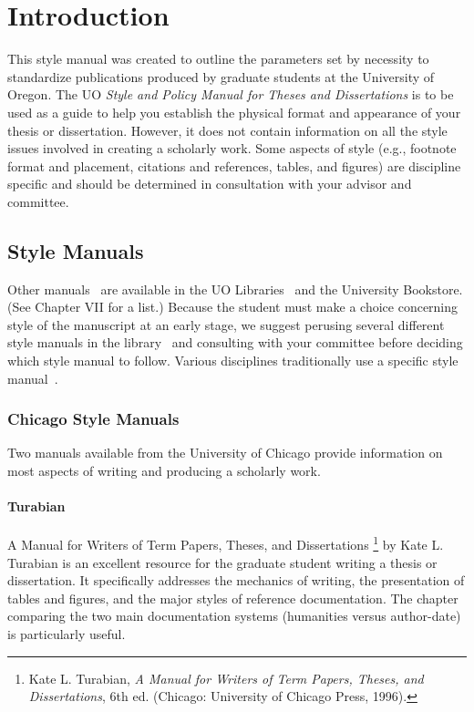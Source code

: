 \chapter{Introduction}


This style manual was created to outline the parameters set by necessity to standardize publications produced by graduate students at the University of Oregon. The UO \emph{Style and Policy Manual for Theses and Dissertations} is to be used as a guide to help you establish the physical format and appearance of your thesis or dissertation. However, it does not contain information on all the style issues involved in creating a scholarly work. Some aspects of style (e.g., footnote format and placement, citations and references, tables, and figures) are discipline specific and should be determined in consultation with your advisor and committee.

\section{Style Manuals}

Other manuals~\cite{Codishetal2000} are available in the UO Libraries~\cite{Meyer2000} and the University Bookstore. (See Chapter VII for a list.) Because the student must make a choice concerning style of the manuscript at an early stage, we suggest perusing several different style manuals in the library~\cite{Huetal2000} and consulting with your committee before deciding which style manual to follow. Various disciplines traditionally use a specific style manual~\cite{Conway2000}.

\subsection{Chicago Style Manuals}

Two manuals available from the University of Chicago provide information on most aspects of writing and producing a scholarly work.

\subsubsection{Turabian}

A Manual for Writers of Term Papers, Theses, and Dissertations \footnote{Kate L. Turabian, \emph{A Manual for Writers of Term Papers, Theses, and Dissertations}, 6th ed. (Chicago: University of Chicago Press, 1996).} by Kate L. Turabian is an excellent resource for the graduate student writing a thesis or dissertation. It specifically addresses the mechanics of writing, the presentation of tables and figures, and the major styles of reference documentation. The chapter comparing the two main documentation systems (humanities versus author-date) is particularly useful.

